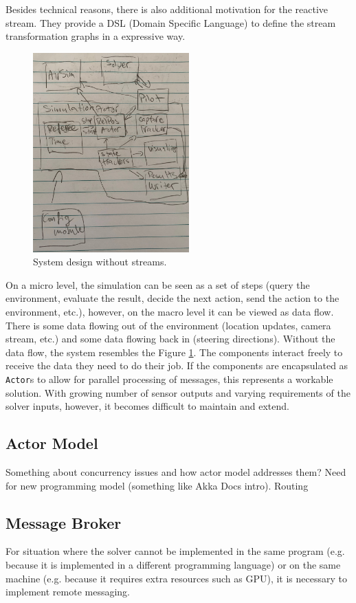 \documentclass{article}
\begin{document}
Besides technical reasons, there is also additional motivation for the reactive stream. They provide a DSL (Domain Specific Language) \cite{dsl-book} to define the stream transformation graphs in a expressive way. 

\begin{figure}
	\centering
	\includegraphics[width=6.0cm]{before-flow}
	\caption{System design without streams.}\label{fig:before-stream}
\end{figure}

On a micro level, the simulation can be seen as a set of steps (query the environment, evaluate the result, decide the next action, send the action to the environment, etc.), however, on the macro level it can be viewed as data flow. There is some data flowing out of the environment (location updates, camera stream, etc.) and some data flowing back in (steering directions). Without the data flow, the system resembles the Figure \ref{fig:before-stream}. The components interact freely to receive the data they need to do their job. If the components are encapsulated as \verb|Actor|s to allow for parallel processing of messages, this represents a workable solution. With growing number of sensor outputs and varying requirements of the solver inputs, however, it becomes difficult to maintain and extend.


\subsection{Actor Model}
Something about concurrency issues and how actor model addresses them?
Need for new programming model (something like Akka Docs intro).
Routing



\subsection{Message Broker}
For situation where the solver cannot be implemented in the same program (e.g. because it is implemented in a different programming language) or on the same machine (e.g. because it requires extra resources such as GPU), it is necessary to implement remote messaging.
 
\end{document}
